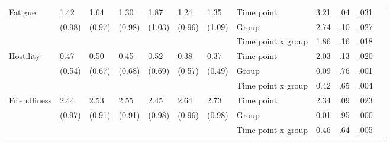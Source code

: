 \documentclass[authordate, empirical]{jote-new-article}
\begin{document}
\begin{table}[th!]
\begin{fullwidth}
{\begin{tabular}{@{} l l l l l l l | l l l l l @{}}
        \hline Fatigue                                 & 1.42                                          & 1.64                 & 1.30                 & 1.87          & 1.24                                  & 1.35   & Time point         & 3.21 & .04  & .031 \\
                                                       & (0.98)                                        & (0.97)               & (0.98)               & (1.03)        & (0.96)                                & (1.09) & Group              & 2.74 & .10  & .027 \\
                                                       &                                               &                      &                      &               &                                       &        & Time point x group & 1.86 & .16  & .018 \\

        \hline Hostility                               & 0.47                                          & 0.50                 & 0.45                 & 0.52          & 0.38                                  & 0.37   & Time point         & 2.03 & .13  & .020 \\
                                                       & (0.54)                                        & (0.67)               & (0.68)               & (0.69)        & (0.57)                                & (0.49) & Group              & 0.09 & .76  & .001 \\
                                                       &                                               &                      &                      &               &                                       &        & Time point x group & 0.42 & .65  & .004 \\

        \hline Friendliness                            & 2.44                                          & 2.53                 & 2.55                 & 2.45          & 2.64                                  & 2.73   & Time point         & 2.34 & .09  & .023 \\
                                                       & (0.97)                                        & (0.91)               & (0.91)               & (0.98)        & (0.96)                                & (0.98) & Group              & 0.01 & .95  & .000 \\
                                                       &                                               &                      &                      &               &                                       &        & Time point x group & 0.46 & .64  & .005 \\


\end{tabular}}
\end{fullwidth}
\end{table}
\end{document}
